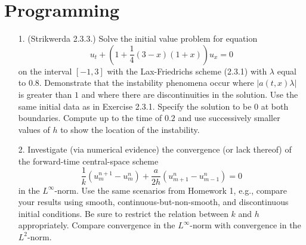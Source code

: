 \documentclass{article}
\providecommand{\abs}[1]{\left\lvert#1\right\rvert}
\begin{document}
\section{Programming}

\begin{itemize}

\item[1.] (Strikwerda 2.3.3.) Solve the initial value problem for equation
\begin{equation*}
u_t + \left( 1 + \frac{1}{4} \left( 3 - x \right) \left( 1 + x \right) \right) u_x = 0
\end{equation*}
on the interval $[-1,3]$ with the Lax-Friedrichs scheme (2.3.1) with $\lambda$ equal to $0.8$. Demonstrate that the instability phenomena occur where $\abs{a(t,x) \lambda}$ is greater than $1$ and where there are discontinuities in the solution. Use the same initial data as in Exercise 2.3.1. Specify the solution to be $0$ at both boundaries. Compute up to the time of $0.2$ and use successively smaller values of $h$ to show the location of the instability.

\item[2.] Investigate (via numerical evidence) the convergence (or lack thereof) of the forward-time central-space scheme
\begin{equation*}
\frac{1}{k} \left( u^{n+1}_m - u^n_m \right) + \frac{a}{2h} \left( u^n_{m+1} - u^n_{m-1} \right) = 0
\end{equation*}
in the $L^{\infty}$-norm. Use the same scenarios from Homework 1, e.g., compare your results using smooth, continuous-but-non-smooth, and discontinuous initial conditions. Be sure to restrict the relation between $k$ and $h$ appropriately. Compare convergence in the $L^{\infty}$-norm with convergence in the $L^2$-norm.

\end{itemize}
\end{document}
